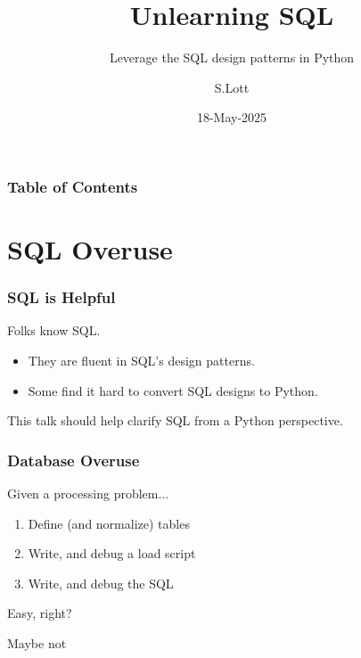 \documentclass{beamer}
\title{Unlearning SQL}
\subtitle{Leverage the SQL design patterns in Python}
\author{S.Lott}
\institute{\texttt{\underline{https://fosstodon.org/@slott56}}\linebreak{}\texttt{\underline{https://github.com/slott56}}}
\date{18-May-2025}
\begin{document}
\frame{
    \titlepage
}



\begin{frame}
\frametitle{Table of Contents}
\tableofcontents
\end{frame}

\section{SQL Overuse}

\begin{frame}
    \frametitle{SQL is Helpful}

    Folks know SQL.

    \vspace{1em}
    \begin{itemize}

    \item They are fluent in SQL's design patterns.

    \item Some find it hard to convert SQL designs to Python.
    \end{itemize}

    \vspace{1em}
    This talk should help clarify SQL from a Python perspective.
\end{frame}

\begin{frame}
    \frametitle{Database Overuse}

    Given a processing problem...\pause

    \begin{enumerate}
        \item Define (and normalize) tables
        \item Write, and debug a load script
        \item Write, and debug the SQL
    \end{enumerate}

    Easy, right? \pause

    \vspace{1em}
    Maybe not
\end{frame}
\end{document}
